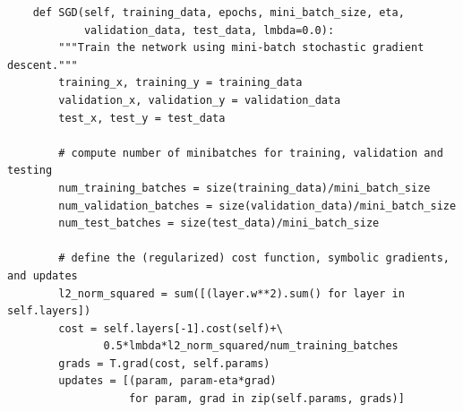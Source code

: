 \begin{lstlisting}
    def SGD(self, training_data, epochs, mini_batch_size, eta, 
            validation_data, test_data, lmbda=0.0):
        """Train the network using mini-batch stochastic gradient descent."""
        training_x, training_y = training_data
        validation_x, validation_y = validation_data
        test_x, test_y = test_data

        # compute number of minibatches for training, validation and testing
        num_training_batches = size(training_data)/mini_batch_size
        num_validation_batches = size(validation_data)/mini_batch_size
        num_test_batches = size(test_data)/mini_batch_size

        # define the (regularized) cost function, symbolic gradients, and updates
        l2_norm_squared = sum([(layer.w**2).sum() for layer in self.layers])
        cost = self.layers[-1].cost(self)+\
               0.5*lmbda*l2_norm_squared/num_training_batches
        grads = T.grad(cost, self.params)
        updates = [(param, param-eta*grad) 
                   for param, grad in zip(self.params, grads)]


\end{lstlisting}
